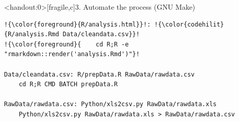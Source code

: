 \documentclass[12pt,t]{beamer}
\begin{document}
\begin{frame}<handout:0>[fragile,c]{3. Automate the process (GNU Make)}

\addtocounter{framenumber}{-1}

\begin{center}
\begin{minipage}[c]{10.8cm}
\begin{semiverbatim}
\begin{lstlisting}[escapechar=!,linewidth=10.8cm]
!{\color{foreground}{R/analysis.html}}!: !{\color{codehilit}{R/analysis.Rmd Data/cleandata.csv}}!
!{\color{foreground}{    cd R;R -e "rmarkdown::render('analysis.Rmd')"}!

Data/cleandata.csv: R/prepData.R RawData/rawdata.csv
    cd R;R CMD BATCH prepData.R

RawData/rawdata.csv: Python/xls2csv.py RawData/rawdata.xls
    Python/xls2csv.py RawData/rawdata.xls > RawData/rawdata.csv
\end{lstlisting}
\end{semiverbatim}
\end{minipage}
\end{center}
\end{frame}
\end{document}
